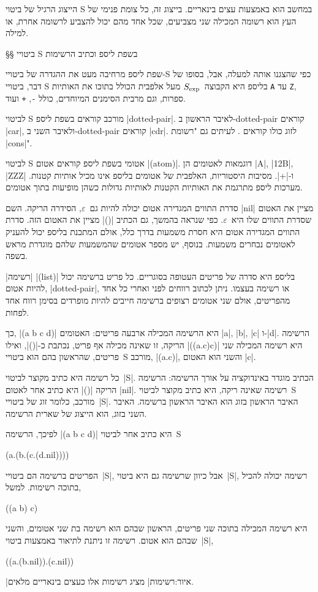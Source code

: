 הייצוג הרגיל של ביטוי S במחשב הוא באמצעות עצים בינאריים. בייצוג זה, כל צומת
פנימי של העץ הוא רשומה המכילה שני מצביעים, שכל אחד מהם יכול להצביע לרשומה אחרת,
או למילה.

§§ ביטויי S בשפת ליספ וכתיב הרשימות

שפת ליספ מרחיבה מעט את ההגדרה של ביטויי-S כפי שהצגנו אותה למעלה, אבל, בסופו של
דבר, ביטויי S בליספ היא הקבוצה~$S_{\text{exp}}$ מעל אלפבית הכולל בתוכו את האותיות
\texttt{A} עד \texttt{Z}, ספרות, וגם מרבית הסימנים המיוחדים, כולל \texttt{-},
\texttt{+} ועוד.

לביטוי S מורכב קוראים בשפת ליספ \E|dotted-pair|. לאיבר הראשון ב-dotted-pair
קוראים \E|car|, ולאיבר השני ב-dotted-pair קוראים \E|cdr|. לזוג כולו קוראים
.
לעיתים גם "רשומת \E|cons|".

לביטוי S אטומי בשפת ליספ קוראים אטום \E|(atom)|. דוגמאות לאטומים הן \E|A|,
\E|12B|, \E|ZZZ| ו-\E|+|. מסיבות היסטוריות, האלפבית של אטומים בליספ אינו מכיל
אותיות קטנות. מערכות ליספ מתרגמת את האותיות הקטנות לאותיות גדולות כשהן מופיעות
בתוך אטומים.

סדרת התווים המגדירה אטום יכולה להיות גם~$ε$, הסידרה הריקה. השם \E|nil| מציין את
האטום שסדרת התווים שלו היא~$ε$. כפי שנראה בהמשך, גם הכתיב \E|()| מציין את האטום
הזה. סדרת התווים המגדירה אטום היא חסרת משמעות בדרך כלל, אולם המתכנת בליספ יכול
להעניק לאטומים נבחרים משמעות. בנוסף, יש מספר אטומים שהמשמעות שלהם מוגדרת מראש
בשפה.

\ע|רשימה| \E|(list)| בליספ היא סדרה של פריטים העטופה בסוגריים. כל פריט ברשימה
יכול להיות אטום, \E|dotted-pair|, או רשימה בעצמו. ניתן לכתוב רווחים לפני ואחרי
כל אחד מהפריטים, אולם שני אטומים רצופים ברשימה חייבים להיות מופרדים בסימן רווח
אחד לפחות.

כך, \E|(a b c d)| היא הרשימה המכילה ארבעה פריטים: האטומים \E|a|, \E|b|, \E|c|
ו-\E|d|. הרשימה הריקה, זו שאינה מכילה אף פריט, נכתבת כ-\E|()|, ואילו
\E|((a.c)c)| היא רשימה המכילה שני פריטים, שהראשון בהם הוא ביטויי~S מורכב,
\E|(a.c)|, והשני הוא האטום \E|c|.

כל רשימה היא כתיב מקוצר לביטוי~\E|S|. הכתיב מוגדר באינדוקציה על אורך הרשימה:
הרשימה הריקה \E|()| היא כתיב אחר לאטום \E|nil|. רשימה שאינה ריקה, היא כתיב
מקוצר לביטוי~S מורכב, כלומר זוג של ביטויי~\E|S|. האיבר הראשון בזוג הוא האיבר
הראשון ברשימה. האיבר השני בזוג, הוא הייצוג של שארית הרשימה.

לפיכך, הרשימה \E|(a b c d)| היא כתיב אחר לביטוי~S
\begin{LISP}
(a.(b.(c.(d.nil))))
\end{LISP}

הפריטים ברשימה הם ביטויי~\E|S|, אבל כיוון שרשימה גם היא ביטוי~\E|S|, רשימה
יכולה להכיל בתוכה רשימות. למשל,
\begin{LISP}
  ((a b) c)
\end{LISP}
היא רשימה המכילה בתוכה שני פריטים, הראשון שבהם הוא רשימה בת שני אטומים, והשני
שבהם הוא אטום. רשימה זו ניתנת לתיאור באמצעות ביטוי~\E|S|,
\begin{LISP}
  ((a.(b.nil)).(c.nil))
\end{LISP}
|איור:רשימות| מציג רשימות אלו כעצים בינאריים מלאים.

